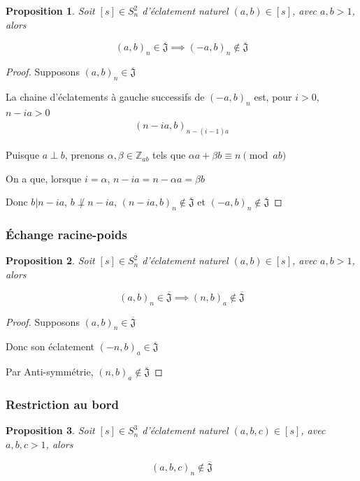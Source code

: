 \documentclass{article}
\newtheorem{proposition}{Proposition}
\newcommand{\J}{\mathfrak{J}}
\newcommand{\JS}{\overline{\J}}
\begin{document}
\begin{proposition}
    Soit $[s] \in S_n^2$ d'éclatement naturel $(a, b) \in [s]$, avec $a, b > 1$, alors

    \[ {(a, b)}_n \in \JS \implies {(-a, b)}_n \not \in \JS \]
\end{proposition}

\begin{proof}
    Supposons ${(a, b)}_n \in \JS$

    La chaine d'éclatements à gauche successifs de ${(-a, b)}_n$ est, pour $i > 0$, $n - ia > 0$
    \begin{align*}
        {(n - ia, b)}_{n-(i-1)a}
    \end{align*}

    Puisque $a \perp b$, prenons $\alpha, \beta \in \mathbb{Z}_{ab}$ tels que $\alpha a + \beta b \equiv n \pmod {ab}$

    On a que, lorsque $i = \alpha$, $n - ia = n - \alpha a = \beta b$

    Donc $b \vert n - ia$, $b \not \perp n - ia$, ${(n - ia, b)}_n \not \in \JS$ et ${(-a, b)}_n \not \in \JS$
\end{proof}

\newpage

\subsubsection{Échange racine-poids}

\begin{proposition}
    Soit $[s] \in S_n^2$ d'éclatement naturel $(a, b) \in [s]$, avec $a, b > 1$, alors
    
    \[ {(a, b)}_n \in \JS \implies {(n, b)}_a \not \in \JS \]
\end{proposition}

\begin{proof}
    Supposons ${(a, b)}_n \in \JS$

    Donc son éclatement ${(-n, b)}_a \in \JS$

    Par Anti-symmétrie, ${(n, b)}_a \not \in \JS$
\end{proof}

\subsubsection{Restriction au bord}

\begin{proposition}
    Soit $[s] \in S_n^3$ d'éclatement naturel $(a, b, c) \in [s]$, avec $a, b, c > 1$, alors
    
    \[ {(a, b, c)}_n \not \in \JS \]
\end{proposition}
\end{document}
